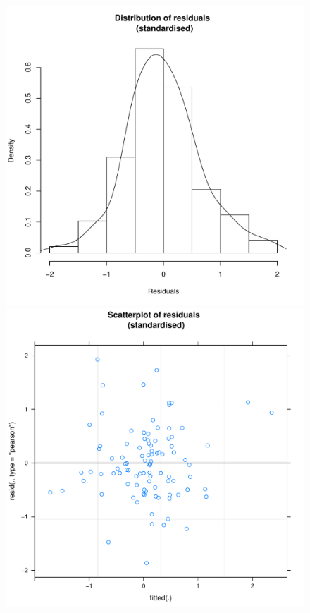 \begin{CJK}{UTF8}{gbsn}

 

 \begin{figure}[htbp]
   \includegraphics[scale =.4]{images/MLM21aHist.pdf}
   \includegraphics[scale =.4]{images/MLM21aScatter.pdf}

\end{figure}
\end{CJK}
